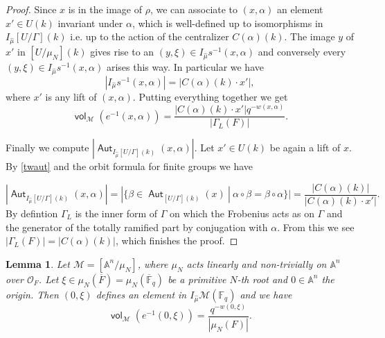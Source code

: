 \documentclass{article}
\DeclareMathOperator{\Aut}{\mathsf{Aut}}
\newcommand{\Mc}{\mathcal{M}}
\DeclareMathOperator{\vol}{\mathsf{vol}}
\newcommand{\BA}{{\mathbb{A}}}
\newcommand{\BF}{{\mathbb{F}}}
\newcommand{\CM}{{\mathcal M}}
\newcommand{\CO}{{\mathcal O}}
\theoremstyle{definition}
\theoremstyle{plain}
\newtheorem{lemma}[definition]{Lemma}
\begin{document}
\begin{proof}
Since $x$ is in the image of $\rho$, we can associate to $(x,\alpha)$ an element $x' \in U(k)$ invariant under $\alpha$, which is well-defined up to isomorphisms in $ I_{\widehat{\mu}}[U/\Gamma](k)$ i.e. up to the action of the centralizer $C(\alpha)(k)$. The image $y$ of $x'$ in $[U/\mu_N](k)$ gives rise to an $(y,\xi)  \in I_{\widehat{\mu}}s^{-1}(x,\alpha)$ and conversely every $(y,\xi)  \in I_{\widehat{\mu}}s^{-1}(x,\alpha)$ arises this way. In particular we have 
\[  |I_{\widehat{\mu}}s^{-1}(x,\alpha)| = |C(\alpha)(k)\cdot x'|,  \]
where $x'$ is any lift of $(x,\alpha)$. Putting everything together we get
 \[ \vol_{\Mc}(e^{-1}(x,\alpha)) = \frac{ |C(\alpha)(k)\cdot x'|q^{-w(x,\alpha)}}{|\Gamma_L(F)|}. \]

Finally we compute $ |\Aut_{I_{\widehat \mu}[U/\Gamma](k)}(x,\alpha)|$. Let $x' \in U(k)$ be again a lift of $x$. By  \eqref{twaut} and the orbit formula for finite groups we have

\[ |\Aut_{I_{\widehat \mu}[U/\Gamma](k)}(x,\alpha)| = |\{ \beta \in \Aut_{[U/\Gamma](k)}(x) \ |\ \alpha \circ \beta = \beta \circ \alpha\}| =\frac{|C(\alpha)(k)|}{|C(\alpha)(k)\cdot x'|}. \]
By defintion $\Gamma_L$ is the inner form of $\Gamma$ on which the Frobenius acts as on $\Gamma$ and the generator of the totally ramified part by conjugation with $\alpha$. From this we see $|\Gamma_L(F)| = |C(\alpha)(k)|$, which finishes the proof.
\end{proof}



\begin{lemma}\label{diagcase} Let $\CM = [\BA^n/\mu_N]$, where $\mu_N$ acts linearly and non-trivially on $\BA^n$ over $\CO_F$. Let $\xi \in \mu_N(\overline{F})= \mu_N(\overline{\BF}_q)$ be a primitive $N$-th root and $0 \in \BA^n$ the origin. Then $(0,\xi)$ defines an element in $I_{\hat{\mu}}\CM(\BF_q)$ and we have
\[  \vol_{\Mc}(e^{-1}(0,\xi)) = \frac{q^{-w(0,\xi)}}{|\mu_N(F)|}. \] 
\end{lemma}
\end{document}
